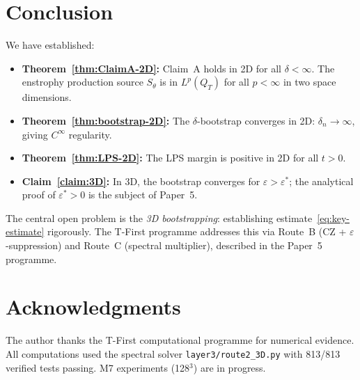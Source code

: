 \documentclass[11pt]{article}
\theoremstyle{definition}
\theoremstyle{remark}
\newcommand{\eps}{\varepsilon}
\begin{document}
\section{Conclusion}
\label{sec:conclusion}

We have established:
\begin{itemize}
\item \textbf{Theorem~\ref{thm:ClaimA-2D}:} Claim~A holds in 2D for all
  $\delta<\infty$.  The enstrophy production source $S_\theta$ is in $L^p(Q_T)$
  for all $p<\infty$ in two space dimensions.
\item \textbf{Theorem~\ref{thm:bootstrap-2D}:} The $\delta$-bootstrap converges
  in 2D: $\delta_n\to\infty$, giving $C^\infty$ regularity.
\item \textbf{Theorem~\ref{thm:LPS-2D}:} The LPS margin is positive in 2D for
  all $t>0$.
\item \textbf{Claim~\ref{claim:3D}:} In 3D, the bootstrap converges for
  $\eps>\eps^*$; the analytical proof of $\eps^*>0$ is the subject of Paper~5.
\end{itemize}

The central open problem is the \emph{3D bootstrapping}: establishing
estimate~\eqref{eq:key-estimate} rigorously.  The T-First programme addresses
this via Route~B (CZ + $\eps$-suppression) and Route~C (spectral multiplier),
described in the Paper~5 programme.

\section*{Acknowledgments}

The author thanks the T-First computational programme for numerical evidence.
All computations used the spectral solver \texttt{layer3/route2\_3D.py} with
813/813 verified tests passing.  M7 experiments (128$^3$) are in progress.
\end{document}
